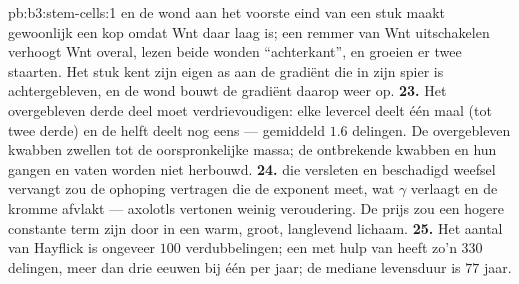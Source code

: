 \begin{solution}{pb:b3:stem-cells:1}
en de wond aan het voorste eind van een stuk maakt gewoonlijk een kop
omdat Wnt daar laag is; een remmer van Wnt uitschakelen verhoogt Wnt
overal, lezen beide wonden ``achterkant'', en groeien er twee staarten.
Het stuk kent zijn eigen as aan de gradiënt die in zijn spier is
achtergebleven, en de wond bouwt de gradiënt daarop weer op.
\textbf{23.} Het overgebleven derde deel moet verdrievoudigen: elke
levercel deelt één maal (tot twee derde) en de helft deelt nog eens ---
gemiddeld $1.6$ delingen. De overgebleven kwabben zwellen tot de
oorspronkelijke massa; de ontbrekende kwabben en hun gangen en vaten
worden niet herbouwd.
\textbf{24.}  die versleten en beschadigd weefsel vervangt
zou de ophoping vertragen die de exponent meet, wat $\gamma$ verlaagt en
de kromme afvlakt --- axolotls vertonen weinig veroudering. De prijs zou
een hogere constante term zijn door  in een warm, groot,
langlevend lichaam.
\textbf{25.} Het aantal van Hayflick is ongeveer $100$ verdubbelingen;
een  met hulp van  heeft zo'n $330$ delingen, meer dan
drie eeuwen bij één per jaar; de mediane levensduur is $77$ jaar.
\end{solution}
